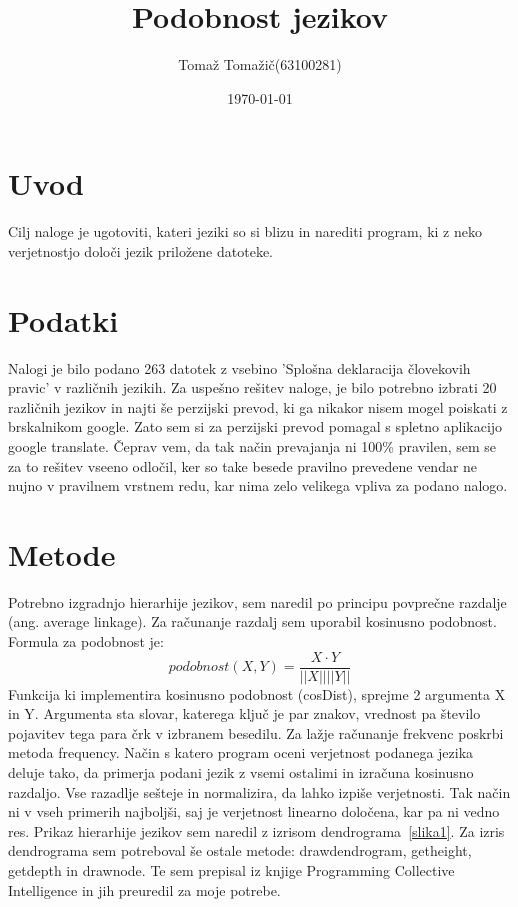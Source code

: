 \documentclass[a4paper,11pt]{article}
\title{Podobnost jezikov}
\author{Tomaž Tomažič(63100281)}
\date{\today}
\begin{document}
\maketitle

\section{Uvod}

Cilj naloge je ugotoviti, kateri jeziki so si blizu in narediti program, ki z neko verjetnostjo določi jezik priložene datoteke.

\section{Podatki}

Nalogi je bilo podano 263 datotek z vsebino 'Splošna deklaracija človekovih pravic' v različnih jezikih. Za uspešno rešitev naloge, je bilo potrebno izbrati 20 različnih jezikov in najti še perzijski prevod, ki ga nikakor nisem mogel poiskati z brskalnikom google. Zato sem si za perzijski prevod pomagal s spletno aplikacijo google translate. Čeprav vem, da tak način prevajanja ni 100\% pravilen, sem se za to rešitev vseeno odločil, ker so take besede pravilno prevedene vendar ne nujno v pravilnem vrstnem redu, kar nima zelo velikega vpliva za podano nalogo.

\section{Metode}

Potrebno izgradnjo hierarhije jezikov, sem naredil po principu povprečne razdalje (ang. average linkage). Za računanje razdalj sem uporabil kosinusno podobnost. 
Formula za podobnost je: 
\begin{equation} 
podobnost(X,Y)= 
\frac{X\cdot Y}
{||X|| ||Y||} 
\end{equation} 
Funkcija ki implementira kosinusno podobnost (cosDist), sprejme 2 argumenta X in Y. Argumenta sta slovar, katerega ključ je par znakov, vrednost pa število pojavitev tega para črk v izbranem besedilu. Za lažje računanje frekvenc poskrbi metoda frequency. Način s katero program oceni verjetnost podanega jezika deluje tako, da primerja podani jezik z vsemi ostalimi in izračuna kosinusno razdaljo. Vse razadlje sešteje in normalizira, da lahko izpiše verjetnosti. Tak način ni v vseh primerih najboljši, saj je verjetnost linearno določena, kar pa ni vedno res.
Prikaz hierarhije jezikov sem naredil z izrisom dendrograma~\ref{slika1}. Za izris dendrograma sem potreboval še ostale metode: drawdendrogram, getheight, getdepth in drawnode. Te sem prepisal iz knjige Programming Collective Intelligence in jih preuredil za moje potrebe.
\end{document}
